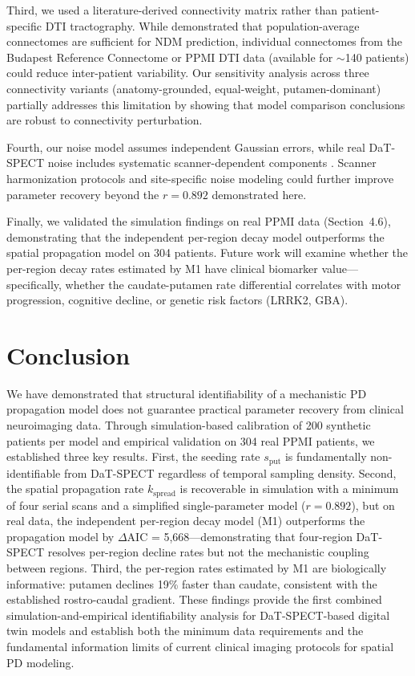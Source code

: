 Third, we used a literature-derived connectivity matrix rather than patient-specific DTI tractography. While \cite{powell2018} demonstrated that population-average connectomes are sufficient for NDM prediction, individual connectomes from the Budapest Reference Connectome or PPMI DTI data (available for $\sim$140 patients) could reduce inter-patient variability. Our sensitivity analysis across three connectivity variants (anatomy-grounded, equal-weight, putamen-dominant) partially addresses this limitation by showing that model comparison conclusions are robust to connectivity perturbation.

Fourth, our noise model assumes independent Gaussian errors, while real DaT-SPECT noise includes systematic scanner-dependent components \cite{tossicibolt2017}. Scanner harmonization protocols and site-specific noise modeling could further improve parameter recovery beyond the $r = 0.892$ demonstrated here.

Finally, we validated the simulation findings on real PPMI data (Section~4.6), demonstrating that the independent per-region decay model outperforms the spatial propagation model on 304 patients. Future work will examine whether the per-region decay rates estimated by M1 have clinical biomarker value---specifically, whether the caudate-putamen rate differential correlates with motor progression, cognitive decline, or genetic risk factors (LRRK2, GBA).

\section{Conclusion}

We have demonstrated that structural identifiability of a mechanistic PD propagation model does not guarantee practical parameter recovery from clinical neuroimaging data. Through simulation-based calibration of 200 synthetic patients per model and empirical validation on 304 real PPMI patients, we established three key results. First, the seeding rate $s_{\text{put}}$ is fundamentally non-identifiable from DaT-SPECT regardless of temporal sampling density. Second, the spatial propagation rate $k_{\text{spread}}$ is recoverable in simulation with a minimum of four serial scans and a simplified single-parameter model ($r = 0.892$), but on real data, the independent per-region decay model (M1) outperforms the propagation model by $\Delta$AIC = 5,668---demonstrating that four-region DaT-SPECT resolves per-region decline rates but not the mechanistic coupling between regions. Third, the per-region rates estimated by M1 are biologically informative: putamen declines 19\% faster than caudate, consistent with the established rostro-caudal gradient. These findings provide the first combined simulation-and-empirical identifiability analysis for DaT-SPECT-based digital twin models and establish both the minimum data requirements and the fundamental information limits of current clinical imaging protocols for spatial PD modeling.


